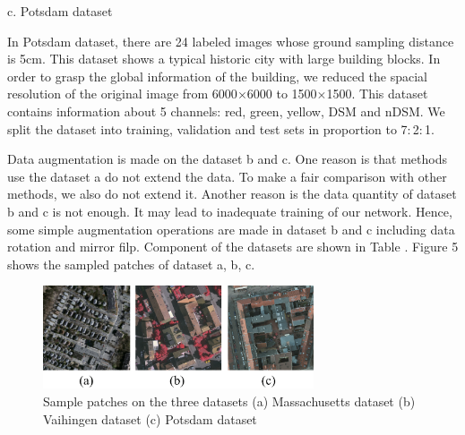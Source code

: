 \setlength{\parindent}{2ex}c. Potsdam dataset\par
\setlength{\parindent}{4ex}In Potsdam dataset, there are 24 labeled images whose ground sampling distance is 5cm. This dataset shows a typical historic city with large building blocks. In order to grasp the global information of the building, we reduced the spacial resolution of the original image from 6000$\times$6000 to 1500$\times$1500. This dataset contains information about 5 channels: red, green, yellow, DSM and nDSM. We split the dataset into training, validation and test sets in proportion to 7${:}$2${:}$1.\par
Data augmentation is made on the dataset b and c. One reason is that methods use the dataset a do not extend the data. To make a fair comparison with other methods, we also do not extend it. Another reason is the data quantity of dataset b and c is not enough. It may lead to inadequate training of our network. Hence, some simple augmentation operations are made in dataset b and c including data rotation and mirror filp. Component of the datasets are shown in Table . Figure 5 shows the sampled patches of dataset a, b, c.\par
\begin{figure}
\centering
\includegraphics[width=8cm]{Figures/datasets.eps}
\caption{Sample patches on the three datasets  (a) Massachusetts dataset (b) Vaihingen dataset (c) Potsdam dataset}
\label{5}
\end{figure}
